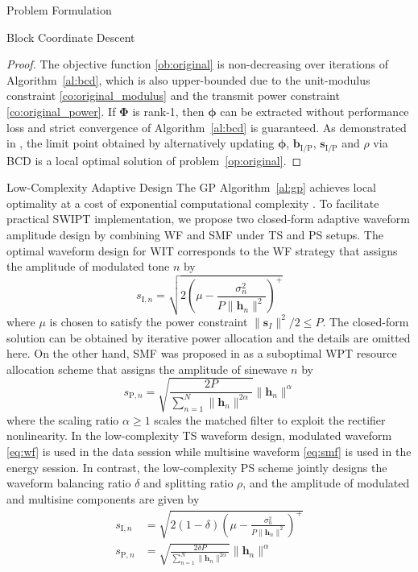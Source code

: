 \documentclass[journal]{IEEEtran}
\begin{document}
\begin{section}{Problem Formulation}
\begin{subsection}{Block Coordinate Descent}
			\begin{proof}\label{pf:bcd}
				The objective function \eqref{ob:original} is non-decreasing over iterations of Algorithm~\ref{al:bcd}, which is also upper-bounded due to the unit-modulus constraint \eqref{co:original_modulus} and the transmit power constraint \eqref{co:original_power}. If $\boldsymbol{\Phi}$ is rank-\num{1}, then $\boldsymbol{\phi}$ can be extracted without performance loss and strict convergence of Algorithm~\ref{al:bcd} is guaranteed. As demonstrated in \cite{Grippo2000}, the limit point obtained by alternatively updating $\boldsymbol{\phi}$, $\boldsymbol{b}_{\mathrm{I/P}}$, $\boldsymbol{s}_{\mathrm{I/P}}$ and $\rho$ via BCD is a local optimal solution of problem~\eqref{op:original}.
			\end{proof}
		\end{subsection}


		\begin{subsection}{Low-Complexity Adaptive Design}
			The GP Algorithm~\ref{al:gp} achieves local optimality at a cost of exponential computational complexity \cite{Chiang2005}. To facilitate practical SWIPT implementation, we propose two closed-form adaptive waveform amplitude design by combining WF and SMF under TS and PS setups. The optimal waveform design for WIT corresponds to the WF strategy that assigns the amplitude of modulated tone $n$ by
			\begin{equation}\label{eq:wf}
				s_{\mathrm{I}, n} = \sqrt{2\left(\mu - \frac{\sigma_n^2}{P \lVert{\boldsymbol{h}_n}\rVert^2}\right)^+}
			\end{equation}
			where $\mu$ is chosen to satisfy the power constraint $\lVert{\boldsymbol{s}_I}\rVert^2 / 2 \le P$. The closed-form solution can be obtained by iterative power allocation \cite{Tse2005} and the details are omitted here. On the other hand, SMF was proposed in \cite{Clerckx2017} as a suboptimal WPT resource allocation scheme that assigns the amplitude of sinewave $n$ by
			\begin{equation}\label{eq:smf}
				s_{\mathrm{P}, n} = \sqrt{\frac{2 P}{\sum_{n=1}^N \lVert{\boldsymbol{h}_n \rVert^{2 \alpha}}}}\lVert{\boldsymbol{h}_n}\rVert^\alpha
			\end{equation}
			where the scaling ratio $\alpha \ge 1$ scales the matched filter to exploit the rectifier nonlinearity. In the low-complexity TS waveform design, modulated waveform \eqref{eq:wf} is used in the data session while multisine waveform \eqref{eq:smf} is used in the energy session. In contrast, the low-complexity PS scheme jointly designs the waveform balancing ratio $\delta$ and splitting ratio $\rho$, and the amplitude of modulated and multisine components are given by
			\begin{align}
				s_{\mathrm{I}, n} &= \sqrt{2(1 - \delta)\left(\mu - \frac{\sigma_n^2}{P \lVert{\boldsymbol{h}_n}\rVert^2}\right)^+} \label{eq:s_i}\\
				s_{\mathrm{P}, n} &= \sqrt{\frac{2 \delta P}{\sum_{n=1}^N \lVert{\boldsymbol{h}_n \rVert^{2 \alpha}}}}\lVert{\boldsymbol{h}_n}\rVert^\alpha \label{eq:s_p}
			\end{align}


\end{subsection}
\end{section}
\end{document}
